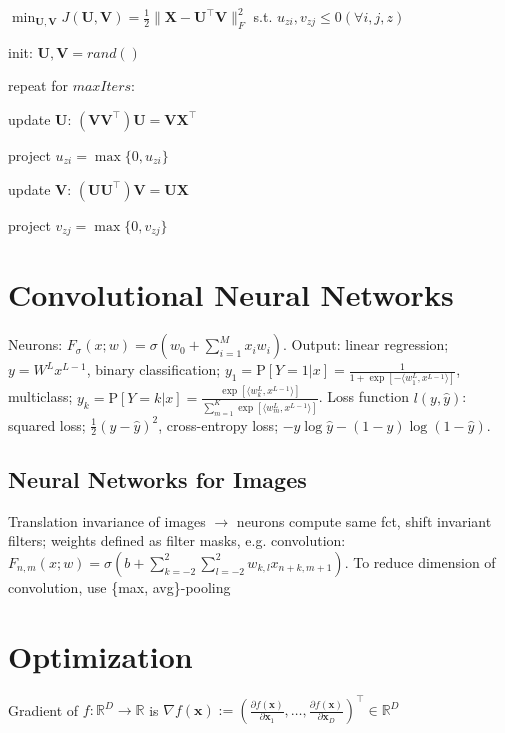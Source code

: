 \documentclass[a4paper, 11pt, landscape]{article}
\begin{document}
\begin{multicols*}{3}
$\min_{\mathbf{U}, \mathbf{V}} J(\mathbf{U}, \mathbf{V}) = \frac{1}{2} \|\mathbf{X} - \mathbf{U}^\top\mathbf{V}\|_F^2$ s.t. $u_{zi},v_{zj} \leq 0 (\forall i,j,z)$
\begin{inparaenum}
	\item init: $\mathbf{U}, \mathbf{V} = rand()$
	\item repeat for $\mathit{maxIters}$:
	\item update $\mathbf{U}$: $(\mathbf{VV}^\top)\mathbf{U} = \mathbf{VX}^\top$
	\item project $u_{zi} = \max \{ 0, u_{zi} \}$
	\item update $\mathbf{V}$: $(\mathbf{UU}^\top)\mathbf{V} = \mathbf{UX}$
	\item project $v_{zj} = \max \{ 0, v_{zj} \}$
\end{inparaenum}

\section{Convolutional Neural Networks}
Neurons: $F_\sigma(x;w) = \sigma(w_0 + \sum_{i=1}^M{x_iw_i})$. Output: linear regression; $y = W^Lx^{L-1}$, binary classification; $y_1 = \text{P}[Y=1|x] = \frac{1}{1 + \exp[-\langle w_1^L,x^{L-1}\rangle]}$, multiclass; $y_k = \text{P}[Y=k|x]= \frac{\exp[\langle w_k^L,x^{L-1}\rangle]}{\sum_{m=1}^{K}{\exp[\langle w_m^L,x^{L-1}\rangle]}}$. Loss function $l(y, \hat{y})$: squared loss; $\frac{1}{2}(y - \hat{y})^2$, cross-entropy loss; $-y \log \hat{y} - (1-y)\log(1-\hat{y})$.

\subsection{Neural Networks for Images}
Translation invariance of images $\rightarrow$ neurons compute same fct, shift invariant filters; weights defined as filter masks, e.g. convolution: $F_{n,m}(x;w) = \sigma(b + \sum_{k=-2}^2\sum_{l=-2}^{2}{w_{k,l}x_{n+k,m+1}})$. To reduce dimension of convolution, use \{max, avg\}-pooling 

\section{Optimization}
Gradient of $f: \mathbb{R}^D \to \mathbb{R}$ is $\nabla f(\mathbf{x}) := \left( \frac{\partial f(\mathbf{x})}{\partial \mathbf{x}_1}, \ldots, \frac{\partial f(\mathbf{x})}{\partial \mathbf{x}_D} \right)^\top \in \mathbb{R}^D$


\end{multicols*}
\end{document}
